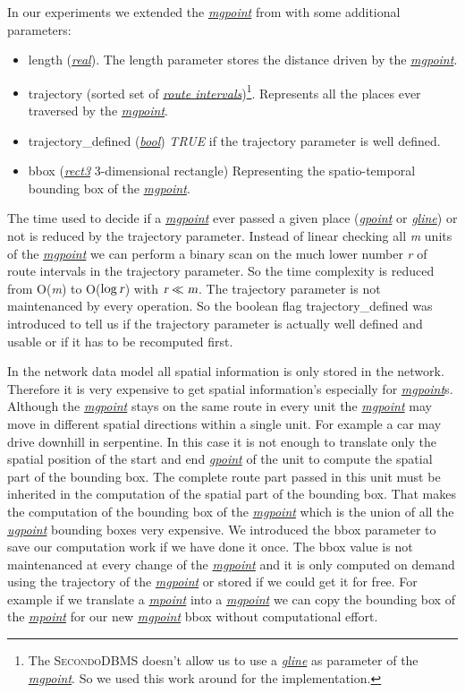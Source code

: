 \documentclass[a4paper]{article}
\newcommand{\secondo}{\textsc{Secondo}}
\newcommand{\var}[1]{\textsl{#1}}
\newcommand{\dt}[1]{\textsl{\underline{#1}}}
\newcommand{\true}{\var{TRUE}}
\begin{document}
In our experiments we extended the \dt{mgpoint} from \cite{1146465} with some additional parameters:
\begin{itemize}
\item length (\dt{real}). The length parameter stores the distance driven by the \dt{mgpoint}.
\item trajectory (sorted set of \dt{route intervals})\footnote{The \secondo{}DBMS doesn't allow us to use a \dt{gline} as parameter of the \dt{mgpoint}. So we used this work around for the implementation.}. Represents all the places ever traversed by the \dt{mgpoint}.
\item trajectory\_defined (\dt{bool}) \true{} if the trajectory parameter is well defined.
\item bbox (\dt{rect3} 3-dimensional rectangle) Representing the spatio-temporal bounding box of the \dt{mgpoint}.
\end{itemize}

The time used to decide if a \dt{mgpoint} ever passed a given place (\dt{gpoint} or \dt{gline}) or not is reduced by the trajectory parameter. Instead of linear checking all \var{m} units of the \dt{mgpoint} we can perform a binary scan on the much lower number \var{r} of route intervals in the trajectory parameter. So the time complexity is reduced from O(\var{m}) to O($\log \var{r}$) with $\var{r} \ll \var{m}$. The trajectory parameter is not maintenanced by every operation. So the boolean flag trajectory\_defined was introduced to tell us if the trajectory parameter is actually well defined and usable or if it has to be recomputed first.

In the network data model all spatial information is only stored in the network. Therefore it is very expensive to get spatial information's especially for \dt{mgpoint}s. Although the \dt{mgpoint} stays on the same route in every unit the \dt{mgpoint} may move in different spatial directions within a single unit. For example a car may drive downhill in serpentine. In this case it is not enough to translate only the spatial position of the start and end \dt{gpoint} of the unit to compute the spatial part of the bounding box. The complete route part passed in this unit must be inherited in the computation of the spatial part of the bounding box. That makes the computation of the bounding box of the \dt{mgpoint} which is the union of all the \dt{ugpoint} bounding boxes very expensive. We introduced the bbox parameter to save our computation work if we have done it once. The bbox value is not maintenanced at every change of the \dt{mgpoint} and it is only computed on demand using the trajectory of the \dt{mgpoint} or stored if we could get it for free. For example if we translate a \dt{mpoint} into a \dt{mgpoint} we can copy the bounding box of the \dt{mpoint} for our new \dt{mgpoint} bbox without computational effort.
\end{document}
